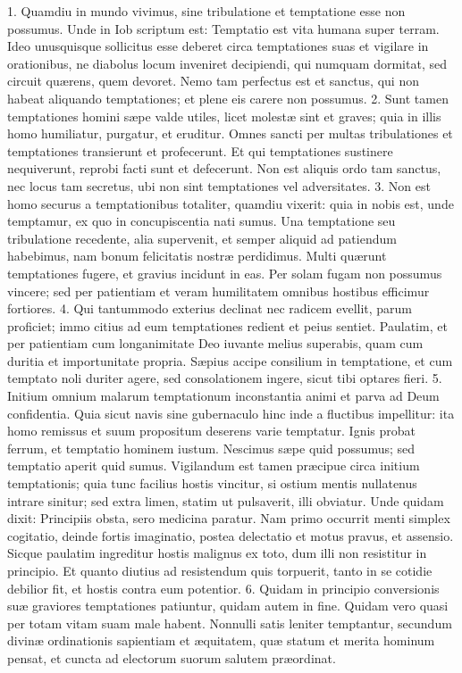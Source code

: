 \documentclass[twoside]{article}
\begin{document}
1. Quamdiu in mundo vivimus, sine tribulatione et temptatione esse non possumus. Unde in Iob scriptum est: Temptatio est vita humana super terram. Ideo unusquisque sollicitus esse deberet circa temptationes suas et vigilare in orationibus, ne diabolus locum inveniret decipiendi, qui numquam dormitat, sed circuit quærens, quem devoret. Nemo tam perfectus est et sanctus, qui non habeat aliquando temptationes; et plene eis carere non possumus.
2. Sunt tamen temptationes homini sæpe valde utiles, licet molestæ sint et graves; quia in illis homo humiliatur, purgatur, et eruditur. Omnes sancti per multas tribulationes et temptationes transierunt et profecerunt. Et qui temptationes sustinere nequiverunt, reprobi facti sunt et defecerunt. Non est aliquis ordo tam sanctus, nec locus tam secretus, ubi non sint temptationes vel adversitates.
3. Non est homo securus a temptationibus totaliter, quamdiu vixerit: quia in nobis est, unde temptamur, ex quo in concupiscentia nati sumus. Una temptatione seu tribulatione recedente, alia supervenit, et semper aliquid ad patiendum habebimus, nam bonum felicitatis nostræ perdidimus. Multi quærunt temptationes fugere, et gravius incidunt in eas. Per solam fugam non possumus vincere; sed per patientiam et veram humilitatem omnibus hostibus efficimur fortiores.
4. Qui tantummodo exterius declinat nec radicem evellit, parum proficiet; immo citius ad eum temptationes redient et peius sentiet. Paulatim, et per patientiam cum longanimitate Deo iuvante melius superabis, quam cum duritia et importunitate propria. Sæpius accipe consilium in temptatione, et cum temptato noli duriter agere, sed consolationem ingere, sicut tibi optares fieri.
5. Initium omnium malarum temptationum inconstantia animi et parva ad Deum confidentia. Quia sicut navis sine gubernaculo hinc inde a fluctibus impellitur: ita homo remissus et suum propositum deserens varie temptatur. Ignis probat ferrum, et temptatio hominem iustum. Nescimus sæpe quid possumus; sed temptatio aperit quid sumus. Vigilandum est tamen præcipue circa initium temptationis; quia tunc facilius hostis vincitur, si ostium mentis nullatenus intrare sinitur; sed extra limen, statim ut pulsaverit, illi obviatur. Unde quidam dixit:
Principiis obsta, sero medicina paratur.
Nam primo occurrit menti simplex cogitatio, deinde fortis imaginatio, postea delectatio et motus pravus, et assensio. Sicque paulatim ingreditur hostis malignus ex toto, dum illi non resistitur in principio. Et quanto diutius ad resistendum quis torpuerit, tanto in se cotidie debilior fit, et hostis contra eum potentior.
6. Quidam in principio conversionis suæ graviores temptationes patiuntur, quidam autem in fine. Quidam vero quasi per totam vitam suam male habent. Nonnulli satis leniter temptantur, secundum divinæ ordinationis sapientiam et æquitatem, quæ statum et merita hominum pensat, et cuncta ad electorum suorum salutem præordinat.
\end{document}
